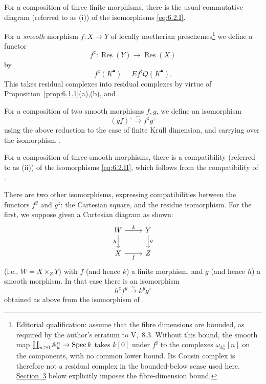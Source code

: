 \label{compat:6.2.i}
For a composition of three finite morphisms, there is the usual commutative diagram (referred to as (i)) of the isomorphisms \eqref{eq:6.2.I}.

For a \emph{smooth} morphism $f\colon X\to Y$ of locally noetherian preschemes\footnote{Editorial qualification: assume that the fibre dimensions are bounded, as required by the author's erratum to V,~8.3. Without this bound, the smooth map $\coprod_{n\geq0}\mathbb A_k^n\to\operatorname{Spec} k$ takes $k[0]$ under $f^\sharp$ to the complexes $\omega_{\mathbb A_k^n}[n]$ on the components, with no common lower bound. Its Cousin complex is therefore not a residual complex in the bounded-below sense used here. \hyperref[sec:6.3]{Section~3} below explicitly imposes the fibre-dimension bound.} we define a functor
\[
f^{z}\colon \operatorname{Res}(Y)\longrightarrow \operatorname{Res}(X)
\]
by
\[
f^{z}(K^\bullet) = Ef^{\sharp}Q(K^\bullet).
\]
This takes residual complexes into residual complexes by virtue of Proposition~\ref{prop:6.1.1}(a),(b), and .

For a composition of two smooth morphisms $f,g$, we define an isomorphism
\[
(gf)^{z} \xrightarrow{\sim} f^{z}g^{z} \tag{II}\label{eq:6.2.II}
\]
using the above reduction to the case of finite Krull dimension, and carrying over the isomorphism .

\label{compat:6.2.ii}
For a composition of three smooth morphisms, there is a compatibility (referred to as (ii)) of the isomorphisms \eqref{eq:6.2.II}, which follows from the compatibility of .

There are two other isomorphisms, expressing compatibilities between the functors $f^{y}$ and $g^{z}$: the Cartesian square, and the residue isomorphism. For the first, we suppose given a Cartesian diagram as shown:
\[
\begin{tikzcd}
	W \arrow[r, "k"] \arrow[d, "h"'] & Y \arrow[d, "g"] \\
	X \arrow[r, "f"'] & Z
\end{tikzcd}
\]
(i.e., $W = X\times_Z Y$) with $f$ (and hence $k$) a finite morphism, and $g$ (and hence $h$) a smooth morphism. In that case there is an isomorphism
\[
h^{z}f^{y} \xrightarrow{\sim} k^{y}g^{z} \tag{III}\label{eq:6.2.III}
\]
obtained as above from the isomorphism of .

